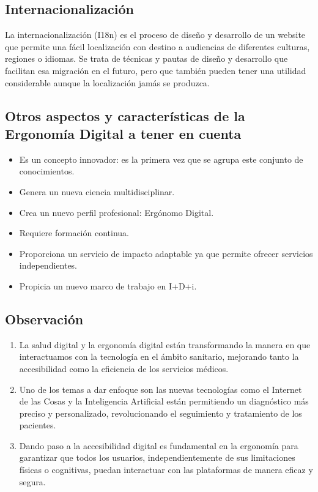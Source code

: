 \documentclass[12pt]{article}
\begin{document}
\subsection*{Internacionalización}
La internacionalización (I18n) es el proceso de diseño y desarrollo de un website que permite una fácil localización con destino a audiencias de diferentes culturas, regiones o idiomas. Se trata de técnicas y pautas de diseño y
desarrollo que facilitan esa migración en el futuro, pero que también pueden tener una utilidad considerable aunque la localización jamás se produzca.


\subsection*{Otros aspectos y características de la Ergonomía Digital a tener en cuenta}
\begin{itemize}
    \item Es un concepto innovador: es la primera vez que se agrupa este conjunto de conocimientos.
    \item Genera un nueva ciencia multidisciplinar.
    \item Crea un nuevo perfil profesional: Ergónomo Digital.
    \item Requiere formación continua.
    \item Proporciona un servicio de impacto adaptable ya que permite ofrecer servicios independientes.
    \item Propicia un nuevo marco de trabajo en I+D+i.
\end{itemize}

\cite{spriErgonomiaDigital}


\subsection*{Observación}
\begin{enumerate}
    \item La salud digital y la ergonomía digital están transformando la manera en que interactuamos con la tecnología en el ámbito sanitario, mejorando tanto la accesibilidad como la eficiencia de los servicios médicos. 
    \item  Uno de los temas a dar enfoque son las nuevas tecnologías como el Internet de las Cosas y la Inteligencia Artificial están permitiendo un diagnóstico más preciso y personalizado, revolucionando el seguimiento y tratamiento de los pacientes.
    \item Dando paso a la accesibilidad digital es fundamental en la ergonomía para garantizar que todos los usuarios, independientemente de sus limitaciones físicas o cognitivas, puedan interactuar con las plataformas de manera eficaz y segura.
\end{enumerate}
\end{document}
